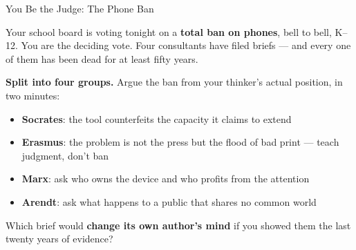 \documentclass[aspectratio=169,11pt]{beamer}
\begin{document}
\begin{frame}{You Be the Judge: The Phone Ban}
\begin{casestudybox}
\small
Your school board is voting tonight on a \textbf{total ban on phones}, bell to bell, K--12. You are the deciding vote. Four consultants have filed briefs --- and every one of them has been dead for at least fifty years.
\end{casestudybox}

\textbf{Split into four groups.} Argue the ban from your thinker's actual position, in two minutes:
\begin{itemize}
    \item \textbf{Socrates}: the tool counterfeits the capacity it claims to extend
    \item \textbf{Erasmus}: the problem is not the press but the flood of bad print --- teach judgment, don't ban
    \item \textbf{Marx}: ask who owns the device and who profits from the attention
    \item \textbf{Arendt}: ask what happens to a public that shares no common world
\end{itemize}

\begin{discussionbox}
Which brief would \textbf{change its own author's mind} if you showed them the last twenty years of evidence?
\end{discussionbox}
\end{frame}
\end{document}
